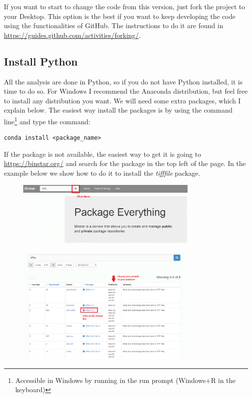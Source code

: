\documentclass[12pt]{article}
\begin{document}
If you want to start to change the code from this version, just fork the project to your Desktop. This option is the best if you want to keep developing the code using the functionalities of GitHub. The instructions to do it are found in \url{https://guides.github.com/activities/forking/}.

\subsection{Install Python}

All the analysis are done in Python, so if you do not have Python installed, it is time to do so. For Windows I recommend the Anaconda distribution, but feel free to install any distribution you want. We will need some extra packages, which I explain below. The easiest way install the packages is by using the command line\footnote{Accessible in Windows by running  in the run prompt (Windows+R in the keyboard)} and type the command:

\begin{lstlisting}
conda install <package_name>
\end{lstlisting}

If the package is not available, the easiest way to get it is going to \url{https://binstar.org/} and search for the package in the top left of the page. In the example below we show how to do it to install the \textit{tifffile} package.

\begin{figure}[h]
\centering
\includegraphics[width=0.8\textwidth]{binstar_search.png}
\end{figure}

\begin{figure}[h]
\centering
\includegraphics[width=0.8\textwidth]{binstar_package.png}
\end{figure}
\end{document}
